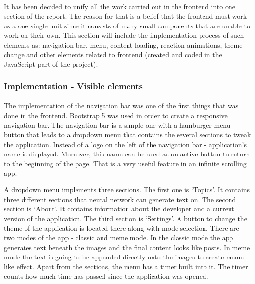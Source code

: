 \documentclass[12pt]{report}
\begin{document}
\paragraph{}
It has been decided to unify all the work carried out in the frontend into one section of the report. The reason for that
is a belief that the frontend must work as a one single unit since it consists of many small components that are unable to
work on their own. This section will include the implementation process of such elements as: navigation bar, menu,
content loading, reaction animations, theme change and other elements related to frontend (created and coded in the
JavaScript part of the project).

\subsubsection*{Implementation - Visible elements}
\paragraph{}
The implementation of the navigation bar was one of the first things that was done in the frontend. Bootstrap 5 was used
in order to create a responsive navigation bar. The navigation bar is a simple one with a hamburger menu button that leads
to a dropdown menu that contains the several sections to tweak the application. Instead of a logo on the left of the navigation
bar - application's name is displayed. Moreover, this name can be used as an active button to return to the beginning of the page.
That is a very useful feature in an infinite scrolling app.

A dropdown menu implements three sections. The first one is `Topics'. It contains three different sections that neural network
can generate text on. The second section is `About'. It contains information about the developer and a current version of the
application. The third section is `Settings'. A button to change the theme of the application is located there along with
mode selection. There are two modes of the app - classic and meme mode. In the classic mode the app generates text beneath
the images and the final content looks like posts. In meme mode the text is going to be appended directly onto the images to create
meme-like effect. Apart from the sections, the menu has a timer built into it. The timer counts how much time has passed since the
application was opened.
\end{document}
